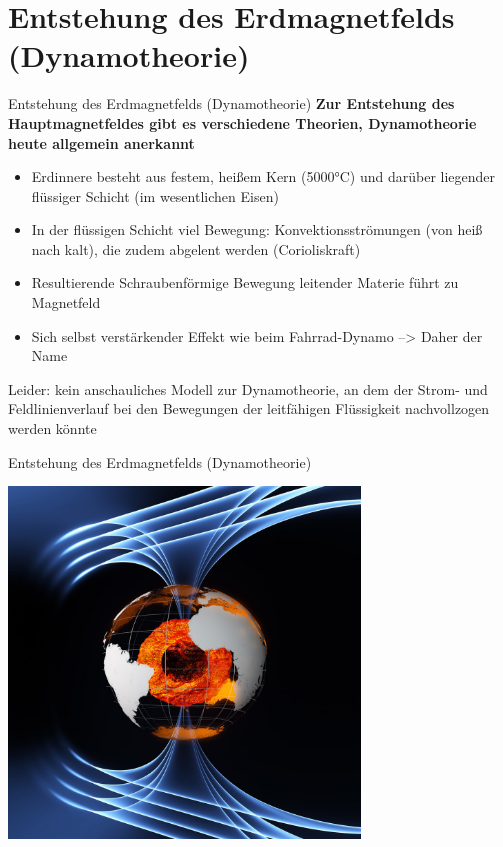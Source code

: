 \documentclass[10pt]{beamer}
\begin{document}
\section{Entstehung des Erdmagnetfelds (Dynamotheorie)}
\begin{frame}{Entstehung des Erdmagnetfelds (Dynamotheorie)}
    \textbf{Zur Entstehung des Hauptmagnetfeldes gibt es verschiedene Theorien, Dynamotheorie heute allgemein anerkannt}\pause
  \begin{itemize}
    \item  Erdinnere besteht aus festem, heißem Kern (5000°C) und darüber liegender flüssiger Schicht (im wesentlichen Eisen)\pause 
    \item In der flüssigen Schicht viel Bewegung: Konvektionsströmungen (von heiß nach kalt), die zudem abgelent werden (Corioliskraft) \pause
    \item Resultierende Schraubenförmige Bewegung leitender Materie führt zu Magnetfeld\pause
    \item Sich selbst verstärkender Effekt wie beim Fahrrad-Dynamo --> Daher der Name\pause
\end{itemize}
Leider: kein anschauliches Modell zur Dynamotheorie, an dem der Strom- und Feldlinienverlauf bei den Bewegungen der leitfähigen Flüssigkeit nachvollzogen werden könnte
\end{frame}
\begin{frame}{Entstehung des Erdmagnetfelds (Dynamotheorie)}
\begin{center}
    \includegraphics[width=0.7\textwidth]{Earth_s_stormy_heart_pillars.jpg}
\end{center}
\end{frame}
\end{document}
